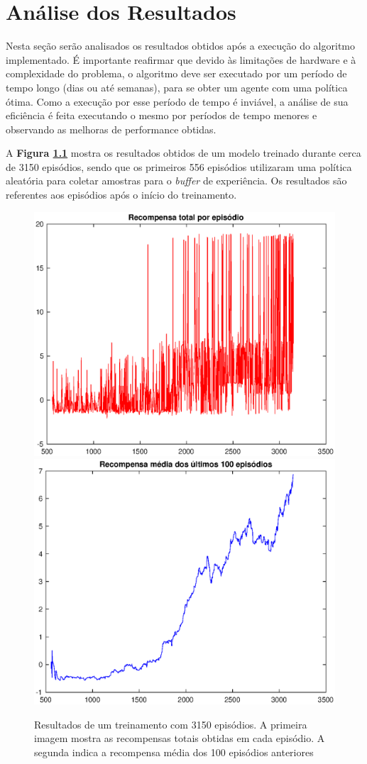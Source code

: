 \chapter{Análise dos Resultados}
\label{chap:result}

Nesta seção serão analisados os resultados obtidos após a execução do algoritmo implementado. É importante reafirmar que devido às limitações de hardware e à complexidade do problema, o algoritmo deve ser executado por um período de tempo longo (dias ou até semanas), para se obter um agente com uma política ótima. Como a execução por esse período de tempo é inviável, a análise de sua eficiência é feita executando o mesmo por períodos de tempo menores e observando as melhoras de performance obtidas.

A \textbf{Figura \ref{fig:resultados_v1}} mostra os resultados obtidos de um modelo treinado durante cerca de 3150 episódios, sendo que os primeiros 556 episódios utilizaram uma política aleatória para coletar amostras para o \textit{buffer} de experiência. Os resultados são referentes aos episódios após o início do treinamento.

\begin{figure}[h]
  \centering
  \includegraphics[width=.55 \textwidth]{conteudo/imgs/resultados/historico_recompensa_v1.eps}
  \includegraphics[width=.55 \textwidth]{conteudo/imgs/resultados/resompensa_media_100_epis_v1.eps}
  \caption[Resultados de Performance]{Resultados de um treinamento com 3150 episódios. A primeira imagem mostra as recompensas totais obtidas em cada episódio. A segunda indica a recompensa média dos 100 episódios anteriores}
  \label{fig:resultados_v1}
\end{figure}

